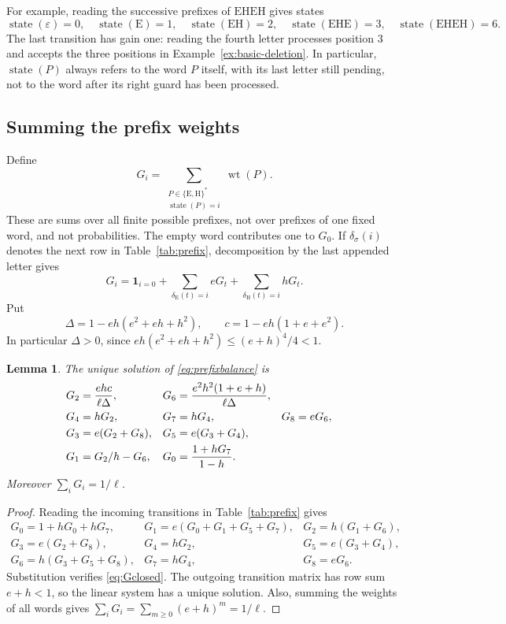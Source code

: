 \documentclass[11pt,a4paper]{article}
\newtheorem{lemma}[theorem]{Lemma}
\theoremstyle{definition}
\theoremstyle{remark}
\newcommand{\wt}{\operatorname{wt}}
\newcommand{\E}{\mathrm E}
\newcommand{\HH}{\mathrm H}
\newcommand{\ind}{\mathbf1}
\DeclareMathOperator{\state}{state}
\begin{document}
For example, reading the successive prefixes of $\E\HH\E\HH$ gives states
\[
\state(\varepsilon)=0,\quad
\state(\E)=1,\quad
\state(\E\HH)=2,\quad
\state(\E\HH\E)=3,\quad
\state(\E\HH\E\HH)=6.
\]
The last transition has gain one: reading the fourth letter processes position 3 and accepts the three positions in Example~\ref{ex:basic-deletion}. In particular, $\state(P)$ always refers to the word $P$ itself, with its last letter still pending, not to the word after its right guard has been processed.

\subsection{Summing the prefix weights}\label{sec:prefix-weights}
Define
\[
G_i=\sum_{\substack{P\in\{\E,\HH\}^*\\\state(P)=i}}\wt(P).
\]
These are sums over all finite possible prefixes, not over prefixes of one fixed word, and not probabilities. The empty word contributes one to $G_0$. If $\delta_\sigma(i)$ denotes the next row in Table~\ref{tab:prefix}, decomposition by the last appended letter gives
\begin{equation}\label{eq:prefixbalance}
G_i=\ind_{i=0}+\sum_{\delta_\E(t)=i}eG_t+\sum_{\delta_\HH(t)=i}hG_t.
\end{equation}
Put
\begin{equation}\label{eq:Delta}
\Delta=1-eh(e^2+eh+h^2),\qquad c=1-eh(1+e+e^2).
\end{equation}
In particular $\Delta>0$, since $eh(e^2+eh+h^2)\le(e+h)^4/4<1$.

\begin{lemma}\label{lem:G}
The unique solution of \eqref{eq:prefixbalance} is
\begin{align}\label{eq:Gclosed}
G_2&=\frac{ehc}{\ell\Delta},&G_6&=\frac{e^2h^2(1+e+h)}{\ell\Delta},\notag\\
G_4&=hG_2,&G_7&=hG_4,&G_8&=eG_6,\\
G_3&=e(G_2+G_8),&G_5&=e(G_3+G_4),\notag\\
G_1&=G_2/h-G_6,&G_0&=\frac{1+hG_7}{1-h}.\notag
\end{align}
Moreover $\sum_iG_i=1/\ell$.
\end{lemma}
\begin{proof}
Reading the incoming transitions in Table~\ref{tab:prefix} gives
\[
\begin{array}{lll}
G_0=1+hG_0+hG_7,&G_1=e(G_0+G_1+G_5+G_7),&G_2=h(G_1+G_6),\\
G_3=e(G_2+G_8),&G_4=hG_2,&G_5=e(G_3+G_4),\\
G_6=h(G_3+G_5+G_8),&G_7=hG_4,&G_8=eG_6.
\end{array}
\]
Substitution verifies \eqref{eq:Gclosed}. The outgoing transition matrix has row sum $e+h<1$, so the linear system has a unique solution. Also, summing the weights of all words gives $\sum_iG_i=\sum_{m\ge0}(e+h)^m=1/\ell$.
\end{proof}
\end{document}
